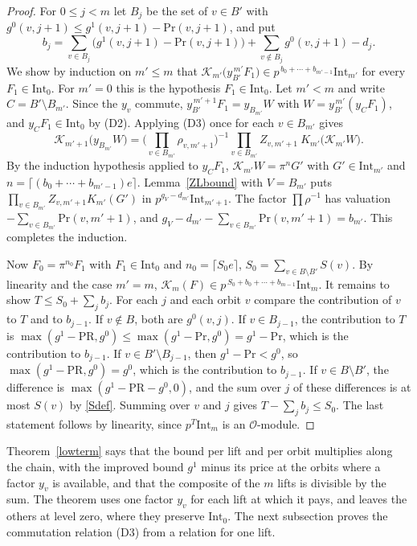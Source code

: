 \begin{proof}
For $0\le j<m$ let $B_j$ be the set of $v\in B'$ with $g^0(v,j+1)\le g^1(v,j+1)-\mathrm{Pr}(v,j+1)$, and put
\[
b_j=\sum_{v\in B_j}\big(g^1(v,j+1)-\mathrm{Pr}(v,j+1)\big)+\sum_{v\notin B_j}g^0(v,j+1)-d_j .
\]
We show by induction on $m'\le m$ that $\mathcal K_{m'}\big(y_{B'}^{\,m'}F_1\big)\in p^{\,b_0+\cdots+b_{m'-1}}\mathrm{Int}_{m'}$ for every $F_1\in\mathrm{Int}_0$. For $m'=0$ this is the hypothesis $F_1\in\mathrm{Int}_0$. Let $m'<m$ and write $C=B'\setminus B_{m'}$. Since the $y_v$ commute, $y_{B'}^{\,m'+1}F_1=y_{B_{m'}}W$ with $W=y_{B'}^{\,m'}(y_CF_1)$, and $y_CF_1\in\mathrm{Int}_0$ by (D2). Applying (D3) once for each $v\in B_{m'}$ gives
\[
\mathcal K_{m'+1}\big(y_{B_{m'}}W\big)=\Big(\prod_{v\in B_{m'}}\rho_{v,m'+1}\Big)^{-1}\prod_{v\in B_{m'}}Z_{v,m'+1}\ K_{m'}\big(\mathcal K_{m'}W\big).
\]
By the induction hypothesis applied to $y_CF_1$, $\mathcal K_{m'}W=\pi^{n}G'$ with $G'\in\mathrm{Int}_{m'}$ and $n=\lceil(b_0+\cdots+b_{m'-1})e\rceil$. Lemma~\ref{ZLbound} with $V=B_{m'}$ puts $\prod_{v\in B_{m'}}Z_{v,m'+1}K_{m'}(G')$ in $p^{g_V-d_{m'}}\mathrm{Int}_{m'+1}$. The factor $\prod\rho^{-1}$ has valuation $-\sum_{v\in B_{m'}}\mathrm{Pr}(v,m'+1)$, and $g_V-d_{m'}-\sum_{v\in B_{m'}}\mathrm{Pr}(v,m'+1)=b_{m'}$. This completes the induction.

Now $F_0=\pi^{n_0}F_1$ with $F_1\in\mathrm{Int}_0$ and $n_0=\lceil S_0e\rceil$, $S_0=\sum_{v\in B\setminus B'}S(v)$. By linearity and the case $m'=m$, $\mathcal K_m(F)\in p^{\,S_0+b_0+\cdots+b_{m-1}}\mathrm{Int}_m$. It remains to show $T\le S_0+\sum_jb_j$. For each $j$ and each orbit $v$ compare the contribution of $v$ to $T$ and to $b_{j-1}$. If $v\notin B$, both are $g^0(v,j)$. If $v\in B_{j-1}$, the contribution to $T$ is $\max(g^1-\mathrm{PR},g^0)\le\max(g^1-\mathrm{Pr},g^0)=g^1-\mathrm{Pr}$, which is the contribution to $b_{j-1}$. If $v\in B'\setminus B_{j-1}$, then $g^1-\mathrm{Pr}<g^0$, so $\max(g^1-\mathrm{PR},g^0)=g^0$, which is the contribution to $b_{j-1}$. If $v\in B\setminus B'$, the difference is $\max(g^1-\mathrm{PR}-g^0,0)$, and the sum over $j$ of these differences is at most $S(v)$ by \eqref{Sdef}. Summing over $v$ and $j$ gives $T-\sum_jb_j\le S_0$. The last statement follows by linearity, since $p^T\mathrm{Int}_m$ is an $\mathcal O$-module.
\end{proof}

Theorem~\ref{lowterm} says that the bound per lift and per orbit multiplies along the chain, with the improved bound $g^1$ minus its price at the orbits where a factor $y_v$ is available, and that the composite of the $m$ lifts is divisible by the sum. The theorem uses one factor $y_v$ for each lift at which it pays, and leaves the others at level zero, where they preserve $\mathrm{Int}_0$. The next subsection proves the commutation relation (D3) from a relation for one lift.

